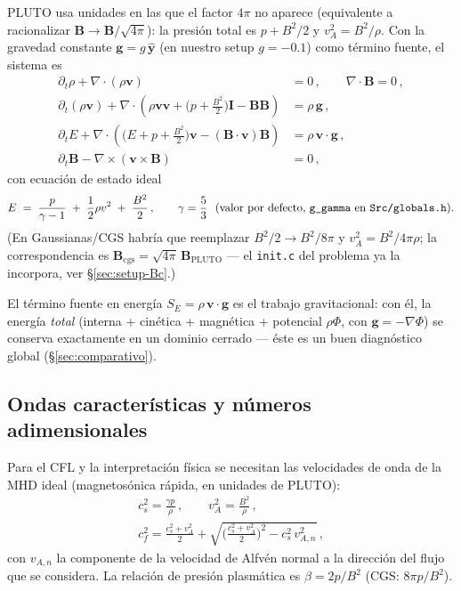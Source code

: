 \documentclass[11pt,a4paper]{article}
\newcommand{\B}{\mathbf{B}}
\newcommand{\vct}{\mathbf{v}}
\newcommand{\dif}{\partial_t}
\newcommand{\difdiv}[1]{\nabla\cdot\left(#1\right)}
\newcommand{\code}[1]{\texttt{#1}}
\begin{document}
PLUTO usa unidades en las que el factor $4\pi$ no aparece (equivalente a racionalizar
$\B\to\B/\sqrt{4\pi}$): la presión total es $p + B^2/2$ y $v_A^2 = B^2/\rho$. Con la gravedad
constante $\mathbf{g}=g\,\hat{\mathbf{y}}$ (en nuestro setup $g=-0.1$) como término fuente, el
sistema es
\begin{align}
\dif\rho + \difdiv{\rho\vct} &= 0\,, \qquad \nabla\cdot\B = 0\,,\\[2pt]
\dif(\rho\vct) + \difdiv{\rho\vct\vct + \Big(p + \tfrac{B^2}{2}\Big)\mathbf{I} - \B\B} &= \rho\,\mathbf{g}\,,\\[2pt]
\dif E + \difdiv{\Big(E + p + \tfrac{B^2}{2}\Big)\vct - (\B\cdot\vct)\B} &= \rho\,\vct\cdot\mathbf{g}\,,\\[2pt]
\dif \B - \nabla\times(\vct\times\B) &= 0\,,
\end{align}
con ecuación de estado ideal
\begin{equation}
E \;=\; \frac{p}{\gamma-1} \;+\; \frac{1}{2}\rho v^2 \;+\; \frac{B^2}{2}\,,
\qquad \gamma = \frac{5}{3}\ \ \text{(valor por defecto, \code{g\_gamma} en \code{Src/globals.h})}.
\end{equation}
(En Gaussianas/CGS habría que reemplazar $B^2/2\to B^2/8\pi$ y $v_A^2=B^2/4\pi\rho$; la
correspondencia es $\B_\mathrm{cgs}=\sqrt{4\pi}\,\B_\mathrm{PLUTO}$ — el \code{init.c} del
problema ya la incorpora, ver \S\ref{sec:setup-Bc}.)

El término fuente en energía $S_E=\rho\,\vct\cdot\mathbf{g}$ es el trabajo gravitacional:
con él, la energía \emph{total} (interna + cinética + magnética + potencial
$\rho\Phi$, con $\mathbf{g}=-\nabla\Phi$) se conserva exactamente en un dominio cerrado ---
éste es un buen diagnóstico global (§\ref{sec:comparativo}).

\subsection{Ondas características y números adimensionales}

Para el CFL y la interpretación física se necesitan las velocidades de onda de la MHD ideal
(magnetosónica rápida, en unidades de PLUTO):
\begin{equation}
\begin{gathered}
c_s^2=\frac{\gamma p}{\rho}\,,
\qquad
v_A^2=\frac{B^2}{\rho}\,,\\[2pt]
c_f^2=\frac{c_s^2+v_A^2}{2}
+\sqrt{\Big(\frac{c_s^2+v_A^2}{2}\Big)^{2}-c_s^2\,v_{A,n}^2}\,,
\end{gathered}
\label{eq:cf}
\end{equation}
con $v_{A,n}$ la componente de la velocidad de Alfvén normal a la dirección del flujo que se
considera. La relación de presión plasmática es $\beta = 2p/B^2$ (CGS: $8\pi p/B^2$).
\end{document}
